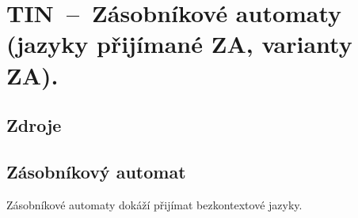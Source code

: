 

\graphicspath{{tin/zasobnikove_automaty/figures}}


\chapter{TIN~--~Zásobníkové automaty (jazyky přijímané ZA, varianty ZA).}


\section{Zdroje}

\begin{compactitem}
    \item {}
    \item {}
    \item {}
\end{compactitem}


\section{Zásobníkový automat}

Zásobníkové automaty dokáží přijímat bezkontextové jazyky.

